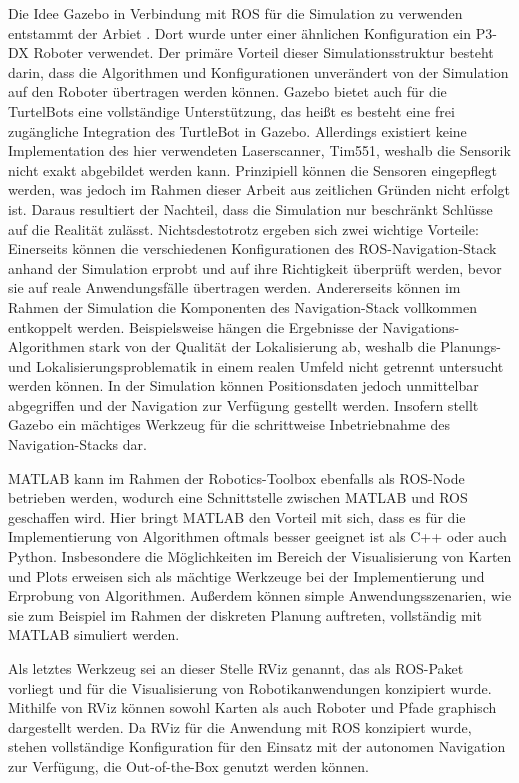  Die Idee Gazebo in Verbindung mit ROS für die Simulation zu verwenden entstammt der Arbiet \cite{ROSGazebo}. Dort wurde unter einer ähnlichen Konfiguration ein P3-DX Roboter verwendet. Der primäre Vorteil dieser Simulationsstruktur besteht darin, dass die Algorithmen und Konfigurationen unverändert von der Simulation auf den Roboter übertragen werden können. Gazebo bietet auch für die TurtelBots eine vollständige Unterstützung, das heißt es besteht eine frei zugängliche Integration des TurtleBot in Gazebo. Allerdings existiert keine Implementation des hier verwendeten Laserscanner, Tim551, weshalb die Sensorik nicht exakt abgebildet werden kann. Prinzipiell können die Sensoren eingepflegt werden, was jedoch im Rahmen dieser Arbeit aus zeitlichen Gründen nicht erfolgt ist. Daraus resultiert der Nachteil, dass die Simulation nur beschränkt Schlüsse auf die Realität zulässt. Nichtsdestotrotz ergeben sich zwei wichtige Vorteile: Einerseits können die verschiedenen Konfigurationen des ROS-Navigation-Stack anhand der Simulation erprobt und auf ihre Richtigkeit überprüft werden, bevor sie auf reale Anwendungsfälle übertragen werden. Andererseits können im Rahmen der Simulation die Komponenten des Navigation-Stack vollkommen entkoppelt werden. Beispielsweise hängen die Ergebnisse der Navigations-Algorithmen stark von der Qualität der Lokalisierung ab, weshalb die Planungs- und Lokalisierungsproblematik in einem realen Umfeld nicht getrennt untersucht werden können. In der Simulation können Positionsdaten jedoch unmittelbar abgegriffen und der Navigation zur Verfügung gestellt werden. Insofern stellt Gazebo ein mächtiges Werkzeug für die schrittweise Inbetriebnahme des Navigation-Stacks dar.

MATLAB kann im Rahmen der Robotics-Toolbox ebenfalls als ROS-Node betrieben werden, wodurch eine Schnittstelle zwischen MATLAB und ROS geschaffen wird. Hier bringt MATLAB den Vorteil mit sich, dass es für die Implementierung von Algorithmen oftmals besser geeignet ist als C++ oder auch Python. Insbesondere die Möglichkeiten im Bereich der Visualisierung von Karten und Plots erweisen sich als mächtige Werkzeuge bei der Implementierung und Erprobung von Algorithmen. Außerdem können simple Anwendungsszenarien, wie sie zum Beispiel im Rahmen der diskreten Planung auftreten, vollständig mit MATLAB simuliert werden.

Als letztes Werkzeug sei an dieser Stelle RViz genannt, das als ROS-Paket vorliegt und für die Visualisierung von Robotikanwendungen konzipiert wurde. Mithilfe von RViz können sowohl Karten als auch Roboter und Pfade graphisch dargestellt werden. Da RViz für die Anwendung mit ROS konzipiert wurde, stehen vollständige Konfiguration für den Einsatz mit der autonomen Navigation zur Verfügung, die Out-of-the-Box genutzt werden können.

